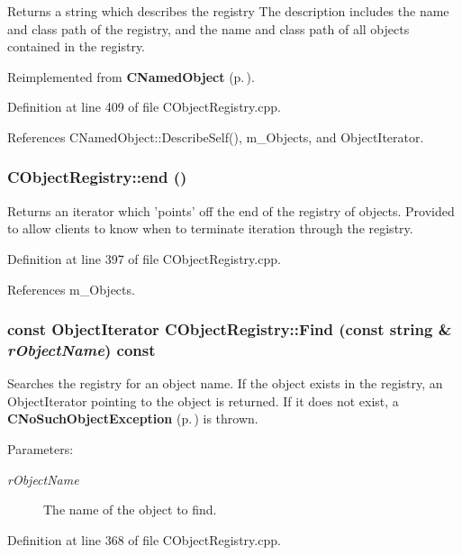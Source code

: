 Returns a string which describes the registry The description includes the name and class path of the registry, and the name and class path of all objects contained in the registry. 

Reimplemented from {\bf CNamed\-Object} {\rm (p.\,\pageref{classCNamedObject_a8})}.

Definition at line 409 of file CObject\-Registry.cpp.

References CNamed\-Object::Describe\-Self(), m\_\-Objects, and Object\-Iterator.
\subsubsection{ CObject\-Registry::end ()}\label{classCObjectRegistry_a8}


Returns an iterator which 'points' off the end of the registry of objects. Provided to allow clients to know when to terminate iteration through the registry. 

Definition at line 397 of file CObject\-Registry.cpp.

References m\_\-Objects.
\subsubsection{\setlength{\rightskip}{0pt plus 5cm}const {\bf Object\-Iterator} CObject\-Registry::Find (const string \& {\em r\-Object\-Name}) const}\label{classCObjectRegistry_a6}


Searches the registry for an object name. If the object exists in the registry, an Object\-Iterator pointing to the object is returned. If it does not exist, a {\bf CNo\-Such\-Object\-Exception} {\rm (p.\,\pageref{classCNoSuchObjectException})} is thrown.\begin{Desc}
\item[Parameters: ]\par
\begin{description}
\item[{\em 
r\-Object\-Name}]The name of the object to find. \end{description}
\end{Desc}


Definition at line 368 of file CObject\-Registry.cpp.

